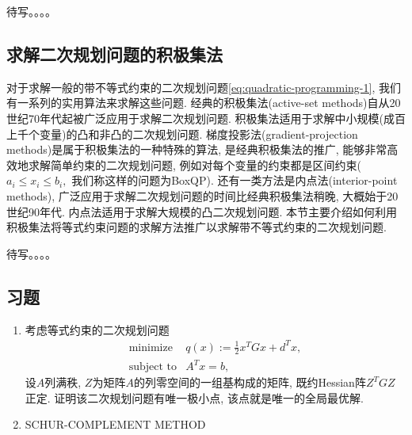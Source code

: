 \documentclass{SBCbookchapter}
\begin{document}
待写。。。。


\subsection{求解二次规划问题的积极集法}
\label{subsec:7.2.2}

对于求解一般的带不等式约束的二次规划问题\eqref{eq:quadratic-programming-1}, 我们有一系列的实用算法来求解这些问题. 经典的积极集法(active-set methods)自从20世纪70年代起被广泛应用于求解二次规划问题. 积极集法适用于求解中小规模(成百上千个变量)的凸和非凸的二次规划问题. 梯度投影法(gradient-projection methods)是属于积极集法的一种特殊的算法, 是经典积极集法的推广, 能够非常高效地求解简单约束的二次规划问题, 例如对每个变量的约束都是区间约束($a_i \leqslant x_i \leqslant b_i,$ 我们称这样的问题为BoxQP). 还有一类方法是内点法(interior-point methods), 广泛应用于求解二次规划问题的时间比经典积极集法稍晚, 大概始于20世纪90年代. 内点法适用于求解大规模的凸二次规划问题. 本节主要介绍如何利用积极集法将等式约束问题的求解方法推广以求解带不等式约束的二次规划问题.

待写。。。。

\subsection*{习题}

\begin{enumerate}
\item 考虑等式约束的二次规划问题
\begin{equation*}
\begin{array}{cl}
\text{minimize} & q(x) := \frac{1}{2} x^T G x + d^T x, \\
\text{subject to} & A^T x = b,
\end{array}
\end{equation*}
设$A$列满秩, $Z$为矩阵$A$的列零空间的一组基构成的矩阵, 既约Hessian阵$Z^T G Z$正定. 证明该二次规划问题有唯一极小点, 该点就是唯一的全局最优解.

\item SCHUR-COMPLEMENT METHOD
\end{enumerate}



\end{document}
